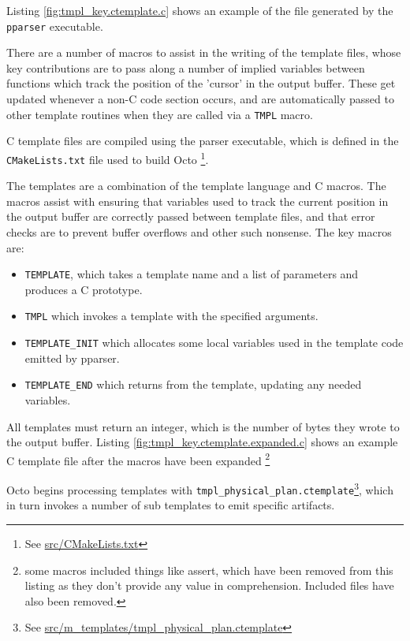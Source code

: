 \documentclass[]{article}
\def\code#1{\texttt{#1}}
\newcommand{\gitlab}[1]{\footnote{See \href{https://gitlab.com/YottaDB/DBMS/YDBOcto/blob/master/#1}{#1}}}
\begin{document}
Listing \ref{fig:tmpl_key.ctemplate.c} shows an example of the file generated by the \code{pparser} executable.

There are a number of macros to assist in the writing of the template files, whose key contributions are to pass along a number of implied variables between functions which track the position of the 'cursor' in the output buffer.
These get updated whenever a non-C code section occurs, and are automatically passed to other template routines when they are called via a \code{TMPL} macro.

C template files are compiled using the parser executable, which is defined in the \code{CMakeLists.txt} file used to build Octo \gitlab{src/CMakeLists.txt}.

The templates are a combination of the template language and C macros.
The macros assist with ensuring that variables used to track the current position in the output buffer are correctly passed between template files, and that error checks are to prevent buffer overflows and other such nonsense.
The key macros are:
\begin{itemize}
	\item \code{TEMPLATE}, which takes a template name and a list of parameters and produces a C prototype.
	\item \code{TMPL} which invokes a template with the specified arguments.
	\item \code{TEMPLATE\_INIT} which allocates some local variables used in the template code emitted by pparser.
	\item \code{TEMPLATE\_END} which returns from the template, updating any needed variables.
\end{itemize}

All templates must return an integer, which is the number of bytes they wrote to the output buffer.
Listing \ref{fig:tmpl_key.ctemplate.expanded.c} shows an example C template file after the macros have been expanded \footnote{some macros included things like assert, which have been removed from this listing as they don't provide any value in comprehension. Included files have also been removed.}

Octo begins processing templates with \code{tmpl\_physical\_plan.ctemplate}\gitlab{src/m\_templates/tmpl\_physical\_plan.ctemplate}, which in turn invokes a number of sub templates to emit specific artifacts.
\end{document}
